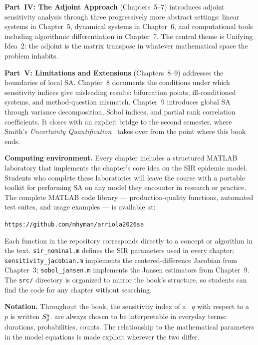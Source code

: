 \textbf{Part~IV: The Adjoint Approach} (Chapters~5--7)
introduces adjoint sensitivity analysis through three
progressively more abstract settings: linear systems
in Chapter~5, dynamical systems in Chapter~6, and
computational tools including algorithmic differentiation
in Chapter~7. The central theme is Unifying Idea~2:
the adjoint is the matrix transpose in whatever
mathematical space the problem inhabits.

\textbf{Part~V: Limitations and Extensions}
(Chapters~8--9) addresses the boundaries of local SA.
Chapter~8 documents the conditions under which sensitivity
indices give misleading results: bifurcation points,
ill-conditioned systems, and method-question mismatch.
Chapter~9 introduces global SA through variance decomposition,
Sobol indices, and partial rank correlation coefficients.
It closes with an explicit bridge to the second semester,
where Smith's \emph{Uncertainty Quantification}~\cite{smith2014uncertainty}
takes over from the point where this book ends.

\medskip

\noindent\textbf{Computing environment.} Every chapter
includes a structured MATLAB laboratory that implements
the chapter's core idea on the SIR epidemic model.
Students who complete these laboratories will leave the
course with a portable toolkit for performing SA on any
model they encounter in research or practice.
The complete MATLAB code library --- production-quality functions,
automated test suites, and usage examples --- is available at:
\begin{center}
  \texttt{https://github.com/mhyman/arriola2026sa}
\end{center}
Each function in the repository corresponds directly to a concept
or algorithm in the text. \texttt{sir\_nominal.m} defines the SIR
parameters used in every chapter; \texttt{sensitivity\_jacobian.m}
implements the centered-difference Jacobian from Chapter~3;
\texttt{sobol\_jansen.m} implements the Jansen estimators from
Chapter~9. The \texttt{src/} directory is organized to mirror
the book's structure, so students can find the code for any
chapter without searching.

\noindent\textbf{Notation.} Throughout the book, the
sensitivity index of a \QOI~$q$ with respect to a
\POI~$p$ is written $S_{p}^{q}$.
\POIs are always chosen to be interpretable in everyday
terms: durations, probabilities, counts. The relationship
to the mathematical parameters in the model equations
is made explicit wherever the two differ.

